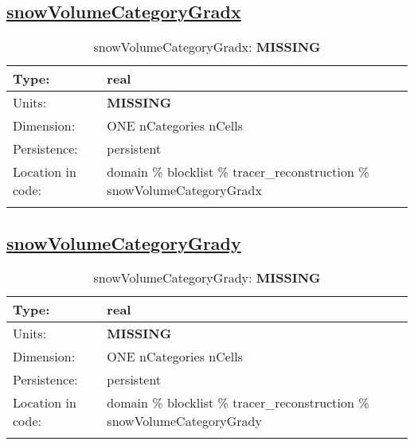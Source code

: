 \subsection[snowVolumeCategoryGradx]{\hyperref[sec:var_tab_tracer_reconstruction]{snowVolumeCategoryGradx}}
\label{subsec:var_sec_tracer_reconstruction_snowVolumeCategoryGradx}
\begin{center}
\begin{longtable}{| p{2.0in} | p{4.0in} |}
        \hline 
        Type: & real \\
        \hline 
        Units: & {\bf \color{red} MISSING} \\
        \hline 
        Dimension: & ONE nCategories nCells \\
        \hline 
        Persistence: & persistent \\
        \hline 
         Location in code: & domain \% blocklist \% tracer\_reconstruction \% snowVolumeCategoryGradx \\
         \hline 
    \caption{snowVolumeCategoryGradx: {\bf \color{red} MISSING}}
\end{longtable}
\end{center}
\subsection[snowVolumeCategoryGrady]{\hyperref[sec:var_tab_tracer_reconstruction]{snowVolumeCategoryGrady}}
\label{subsec:var_sec_tracer_reconstruction_snowVolumeCategoryGrady}
\begin{center}
\begin{longtable}{| p{2.0in} | p{4.0in} |}
        \hline 
        Type: & real \\
        \hline 
        Units: & {\bf \color{red} MISSING} \\
        \hline 
        Dimension: & ONE nCategories nCells \\
        \hline 
        Persistence: & persistent \\
        \hline 
         Location in code: & domain \% blocklist \% tracer\_reconstruction \% snowVolumeCategoryGrady \\
         \hline 
    \caption{snowVolumeCategoryGrady: {\bf \color{red} MISSING}}
\end{longtable}
\end{center}
